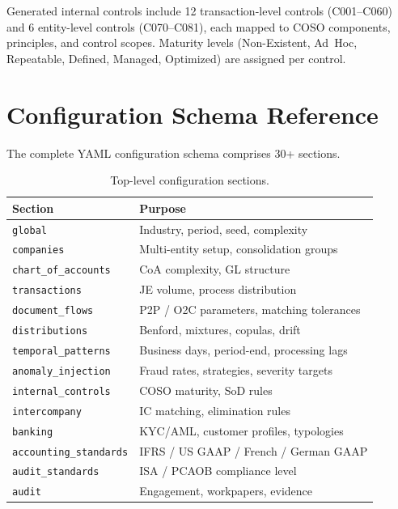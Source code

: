 Generated internal controls include 12 transaction-level controls
(C001--C060) and 6 entity-level controls (C070--C081), each mapped to
COSO components, principles, and control scopes.  Maturity levels
(Non-Existent, Ad~Hoc, Repeatable, Defined, Managed, Optimized) are
assigned per control.

\section{Configuration Schema Reference}
\label{app:config}

The complete YAML configuration schema comprises 30+ sections.

\begin{table}[H]
\centering
\caption{Top-level configuration sections.}
\label{tab:config_sections}
\small
\begin{tabular}{lp{8cm}}
\toprule
\textbf{Section} & \textbf{Purpose} \\
\midrule
\texttt{global}                & Industry, period, seed, complexity \\
\texttt{companies}             & Multi-entity setup, consolidation groups \\
\texttt{chart\_of\_accounts}   & CoA complexity, GL structure \\
\texttt{transactions}          & JE volume, process distribution \\
\texttt{document\_flows}       & P2P / O2C parameters, matching tolerances \\
\texttt{distributions}         & Benford, mixtures, copulas, drift \\
\texttt{temporal\_patterns}    & Business days, period-end, processing lags \\
\texttt{anomaly\_injection}    & Fraud rates, strategies, severity targets \\
\texttt{internal\_controls}    & COSO maturity, SoD rules \\
\texttt{intercompany}          & IC matching, elimination rules \\
\texttt{banking}               & KYC/AML, customer profiles, typologies \\
\texttt{accounting\_standards} & IFRS / US GAAP / French / German GAAP \\
\texttt{audit\_standards}      & ISA / PCAOB compliance level \\
\texttt{audit}                 & Engagement, workpapers, evidence \\

\end{tabular}
\end{table}
